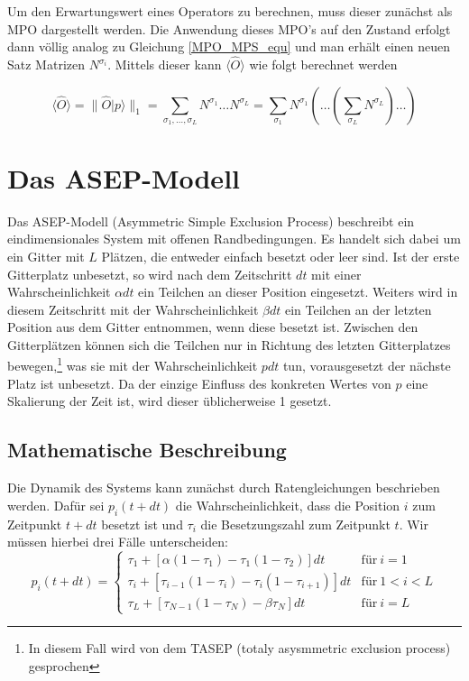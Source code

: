 \documentclass[10pt,a4paper]{report}
\newcommand{\SumIndex}{\sigma_1,\ldots,\sigma_L}
\begin{document}
Um den Erwartungswert eines Operators zu berechnen, muss dieser zunächst als MPO dargestellt werden. Die Anwendung dieses MPO's auf den Zustand erfolgt dann völlig analog zu Gleichung \ref{MPO_MPS_equ} und man erhält einen neuen Satz Matrizen $N^{\sigma_i}$. Mittels dieser kann $\langle\hat{O}\rangle$ wie folgt berechnet werden

\begin{equation}
\langle\hat{O}\rangle=\parallel \hat{O}|p\rangle\parallel_1=\sum_{\SumIndex}N^{\sigma_1}\ldots N^{\sigma_L}=\sum_{\sigma_1}N^{\sigma_1}(\ldots(\sum_{\sigma_L}N^{\sigma_L})\ldots)
\end{equation}




\chapter{Das ASEP-Modell}
Das ASEP-Modell (Asymmetric Simple Exclusion Process) beschreibt ein eindimensionales System mit offenen Randbedingungen. Es handelt sich dabei um ein Gitter mit $L$ Plätzen, die entweder einfach besetzt oder leer sind. Ist der erste Gitterplatz unbesetzt, so wird nach dem Zeitschritt $dt$ mit einer Wahrscheinlichkeit $\alpha dt$ ein Teilchen an dieser Position eingesetzt. Weiters wird in diesem Zeitschritt mit der Wahrscheinlichkeit $\beta dt$ ein Teilchen an der letzten Position aus dem Gitter entnommen, wenn diese besetzt ist. Zwischen den Gitterplätzen können sich die Teilchen nur in Richtung des letzten Gitterplatzes bewegen,\footnote{In diesem Fall wird von dem TASEP (totaly asysmmetric exclusion process) gesprochen} was sie mit der Wahrscheinlichkeit $pdt$ tun, vorausgesetzt der nächste Platz ist unbesetzt. Da der einzige Einfluss des konkreten Wertes von $p$ eine Skalierung der Zeit ist, wird  dieser üblicherweise 1 gesetzt.\\

\section{Mathematische Beschreibung}
Die Dynamik des Systems kann zunächst durch Ratengleichungen beschrieben werden. Dafür sei $p_i(t+dt)$ die Wahrscheinlichkeit, dass die Position $i$ zum Zeitpunkt $t+dt$ besetzt ist und $\tau_i$ die Besetzungszahl zum Zeitpunkt $t$. Wir müssen hierbei drei Fälle unterscheiden:
\begin{equation}\label{rate_equ}
p_i(t+dt)=
\begin{cases}
\tau_1+[\alpha(1-\tau_1)-\tau_1(1-\tau_2)]dt & \text{für}\ i=1\\
\tau_i+[\tau_{i-1}(1-\tau_i)-\tau_i(1-\tau_{i+1})]dt & \text{für}\ 1<i<L\\
\tau_L+[\tau_{N-1}(1-\tau_N)-\beta\tau_N]dt & \text{für}\ i=L
\end{cases}
\end{equation}
\end{document}
